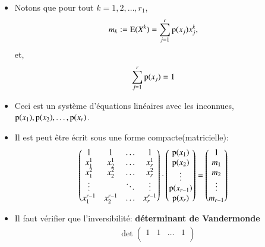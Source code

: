 \begin{frame}
\begin{itemize}
         \framebreak
         \item Notons que pour tout $k=1, 2, \ldots, r_1$,
         \begin{align*}
             m_k &:=\operatorname{E}(X^k) = \sum_{j=1}^r\operatorname{p}(x_j)x_j^k,
         \end{align*}
         et,
         \begin{align*}
             \sum_{j=1}^r\operatorname{p}(x_j)&=1
         \end{align*}
         \item Ceci est un système d'équations linéaires avec les inconnues, $\operatorname{p}(x_1), \operatorname{p}(x_2), \ldots, \operatorname{p}(x_r)$.
         \item Il est peut être écrit sous une forme compacte(matricielle): 
         \begin{align*}
            \begin{pmatrix}
                1&1&\ldots&1\\
                x_1^1&x_2^1&\ldots&x_r^1\\
                x_1^2&x_2^2&\ldots&x_r^2\\
                \vdots&&\ddots&\vdots\\
                x_1^{r-1}&x_2^{r-1}&\ldots&x_r^{r-1}
             \end{pmatrix} \cdot \begin{pmatrix}
                \operatorname{p}(x_1)\\
                \operatorname{p}(x_2)\\
                \vdots\\
                \operatorname{p}(x_{r-1})\\
                \operatorname{p}(x_r)
             \end{pmatrix}
             &=\begin{pmatrix}
                1\\
                 m_1\\
                 m_2\\
                 \vdots\\
                 m_{r-1}
             \end{pmatrix}
         \end{align*}
         \framebreak
         \item Il faut vérifier que l'inversibilité: \textbf{déterminant de Vandermonde}
         \begin{align*}
            \det\begin{pmatrix}
                1&1&\ldots&1\\

\end{pmatrix}
\end{align*}
\end{itemize}
\end{frame}
